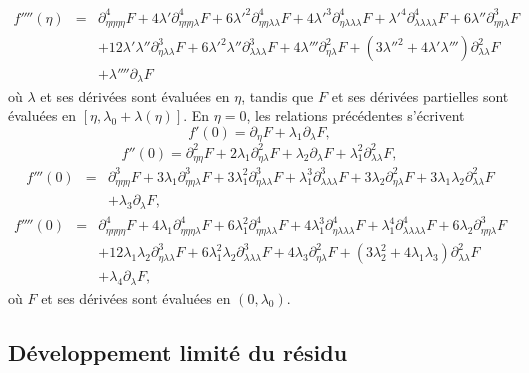 \documentclass{article}
\begin{document}
\begin{eqnarray}
  f'''' (\eta) & = & \partial_{\eta  \eta  \eta
  \eta}^4 F + 4 λ' \partial_{\eta  \eta  \eta
  λ}^4 {F + 6 λ'}^2 \partial_{\eta  \eta  λ
   λ}^4 {F + 4 λ'}^3 \partial_{\eta  λ
   λ  λ}^4 {F + λ'}^4 \partial_{λ
   λ  λ  λ}^4 F + 6 λ''
  \partial_{\eta  \eta  λ}^3 F \nonumber\\
  &  & + 12 λ' λ'' \partial_{\eta  λ
  λ}^3 {F + 6 λ'}^2 λ'' \partial_{λ  λ
   λ}^3 F + 4 λ''' \partial_{\eta  λ}^2 F +
  \left( {3 λ''}^2 + 4 λ' λ''' \right) \partial_{λ
   λ}^2 F \\
  &  & + λ'''' \partial_{λ} F
\end{eqnarray}
où $λ$ et ses dérivées sont évaluées en $\eta$,
tandis que $F$ et ses dérivées partielles sont évaluées en
$[\eta, λ_0 + λ (\eta)]$. En $\eta = 0$, les relations
précédentes s'écrivent
\begin{equation}
  \label{eq20220107060454} f' (0) = \partial_{\eta} F + λ_1
  \partial_{λ} F,
\end{equation}
\begin{equation}
  \label{eq20220107124311} f'' (0) = \partial_{\eta  \eta}^2 F + 2
  λ_1 \partial_{\eta  λ}^2 F + λ_2
  \partial_{λ} F + λ_1^2 \partial_{λ  λ}^2 F,
\end{equation}
\begin{eqnarray}
  f''' (0) & = & \partial_{\eta  \eta  \eta}^3 F + 3 λ_1
  \partial_{\eta  \eta  λ}^3 F + 3 λ_1^2
  \partial_{\eta  λ  λ}^3 F + λ_1^3
  \partial_{λ  λ  λ}^3 F + 3 λ_2
  \partial_{\eta  λ}^2 F + 3 λ_1 λ_2
  \partial_{λ  λ}^2 F \nonumber\\
  &  &  + λ_3 \partial_{λ} F,  \label{eq20220107060500}
\end{eqnarray}
\begin{eqnarray}
  f'''' (0) & = & \partial_{\eta  \eta  \eta  \eta}^4
  F + 4 λ_1 \partial_{\eta  \eta  \eta
  λ}^4 F + 6 λ_1^2 \partial_{\eta  \eta  λ
   λ}^4 F + 4 λ_1^3 \partial_{\eta  λ
   λ  λ}^4 F + λ_1^4 \partial_{λ
   λ  λ  λ}^4 F + 6 λ_2
  \partial_{\eta  \eta  λ}^3 F \nonumber\\
  &  & + 12 λ_1 λ_2 \partial_{\eta  λ
  λ}^3 F + 6 λ_1^2 λ_2 \partial_{λ  λ
   λ}^3 F + 4 λ_3 \partial_{\eta  λ}^2 F +
  (3 λ_2^2 + 4 λ_1 λ_3) \partial_{λ
  λ}^2 F \nonumber\\
  &  & + λ_4 \partial_{λ} F,
\end{eqnarray}
où $F$ et ses dérivées sont évaluées en $(0, λ_0)$.

\subsection{Développement limité du
résidu}\label{sec20211112182000}
\end{document}
